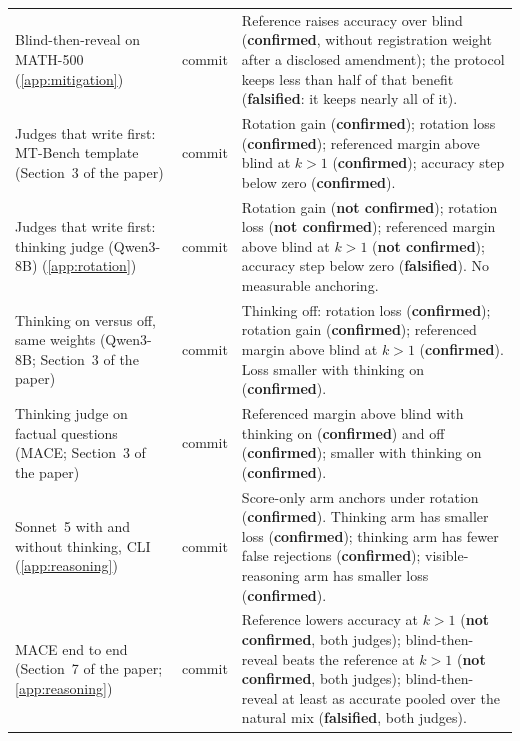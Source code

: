 {\begin{longtable}{L{3.2cm}L{1.1cm}L{8.7cm}}
Blind-then-reveal on MATH-500 (\cref{app:mitigation}) & commit & Reference raises accuracy over blind (\textbf{confirmed}, without registration weight after a disclosed amendment); the protocol keeps less than half of that benefit (\textbf{falsified}: it keeps nearly all of it). \\
Judges that write first: MT-Bench template (Section~3 of the paper) & commit & Rotation gain (\textbf{confirmed}); rotation loss (\textbf{confirmed}); referenced margin above blind at $k{>}1$ (\textbf{confirmed}); accuracy step below zero (\textbf{confirmed}). \\
Judges that write first: thinking judge (Qwen3-8B) (\cref{app:rotation}) & commit & Rotation gain (\textbf{not confirmed}); rotation loss (\textbf{not confirmed}); referenced margin above blind at $k{>}1$ (\textbf{not confirmed}); accuracy step below zero (\textbf{falsified}). No measurable anchoring. \\
Thinking on versus off, same weights (Qwen3-8B; Section~3 of the paper) & commit & Thinking off: rotation loss (\textbf{confirmed}); rotation gain (\textbf{confirmed}); referenced margin above blind at $k{>}1$ (\textbf{confirmed}). Loss smaller with thinking on (\textbf{confirmed}). \\
Thinking judge on factual questions (\textsc{MACE}; Section~3 of the paper) & commit & Referenced margin above blind with thinking on (\textbf{confirmed}) and off (\textbf{confirmed}); smaller with thinking on (\textbf{confirmed}). \\
Sonnet~5 with and without thinking, CLI (\cref{app:reasoning}) & commit & Score-only arm anchors under rotation (\textbf{confirmed}). Thinking arm has smaller loss (\textbf{confirmed}); thinking arm has fewer false rejections (\textbf{confirmed}); visible-reasoning arm has smaller loss (\textbf{confirmed}). \\
\textsc{MACE} end to end (Section~7 of the paper; \cref{app:reasoning}) & commit & Reference lowers accuracy at $k{>}1$ (\textbf{not confirmed}, both judges); blind-then-reveal beats the reference at $k{>}1$ (\textbf{not confirmed}, both judges); blind-then-reveal at least as accurate pooled over the natural mix (\textbf{falsified}, both judges). \\

\end{longtable}}
